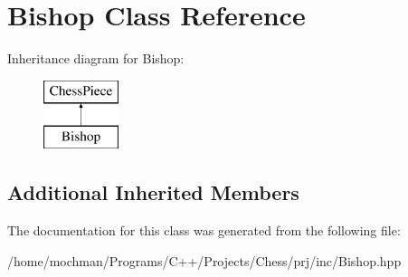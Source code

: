 \hypertarget{class_bishop}{\section{Bishop Class Reference}
\label{class_bishop}
}
Inheritance diagram for Bishop\-:\begin{figure}[H]
\begin{center}
\leavevmode
\includegraphics[height=2.000000cm]{class_bishop}
\end{center}
\end{figure}
\subsection*{Additional Inherited Members}


The documentation for this class was generated from the following file\-:\begin{DoxyCompactItemize}
\item 
/home/mochman/\-Programs/\-C++/\-Projects/\-Chess/prj/inc/Bishop.\-hpp\end{DoxyCompactItemize}

